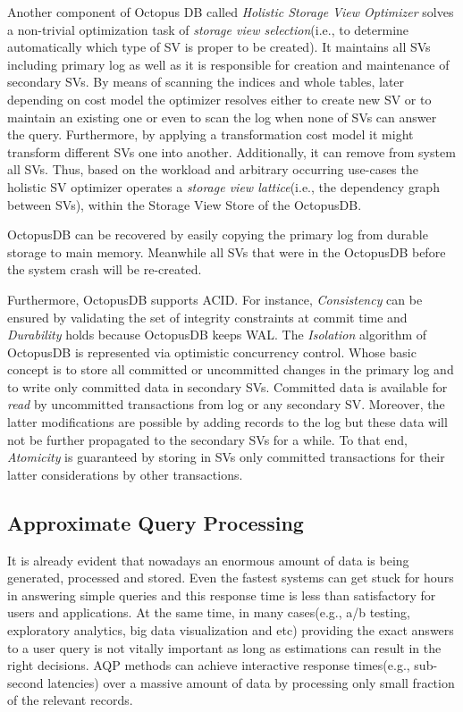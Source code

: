 \documentclass[10pt, conference, compsocconf]{IEEEtran}
\begin{document}
Another component of Octopus DB called \textit{Holistic Storage View Optimizer} solves a non-trivial optimization task of \textit{storage view selection}(i.e., to determine automatically which type of SV is proper to be created). It maintains all SVs including primary log as well as it is responsible for creation and maintenance of secondary SVs. By means of scanning the indices and whole tables, later  depending on cost model the optimizer resolves either to create new SV or to maintain an existing one or even to scan the log when none of SVs can answer the query. Furthermore, by applying a transformation cost model it might transform different SVs one into another. Additionally, it can remove from system all SVs. Thus, based on the workload and arbitrary occurring use-cases the holistic SV optimizer operates a \textit{storage view lattice}(i.e., the dependency graph between SVs), within the Storage View Store of the OctopusDB.

OctopusDB can be recovered by easily copying the primary log from durable storage to main memory. Meanwhile all SVs that were in the OctopusDB before the system crash will be re-created.

Furthermore, OctopusDB supports ACID. For instance, \textit{Consistency} can be ensured by validating the set of integrity constraints at commit time and \textit{Durability} holds because OctopusDB keeps WAL. The \textit{Isolation} algorithm of OctopusDB is represented via optimistic concurrency control. Whose basic concept is to store all committed or uncommitted changes in the primary log and to write only committed data in secondary SVs. Committed data is available for \textit{read} by uncommitted transactions from log or any secondary SV. Moreover, the latter modifications are possible by adding records to the log but these data will not be further propagated to the secondary SVs for a while. To that end, \textit{Atomicity} is guaranteed by storing in SVs only committed transactions for their latter considerations by other transactions.
\subsection{Approximate Query Processing}
It is already evident that nowadays an enormous amount of data is being generated, processed and stored. Even the fastest systems can get stuck for hours in answering simple queries and this response time is less than satisfactory for users and applications. At the same time, in many cases(e.g., a/b testing, exploratory analytics, big data visualization and etc) providing the exact answers to a user query is not vitally important as long as estimations can result in the right decisions. AQP methods can achieve interactive response times(e.g., sub-second latencies) over a massive amount of data by processing only small fraction of the relevant records. 
\end{document}
